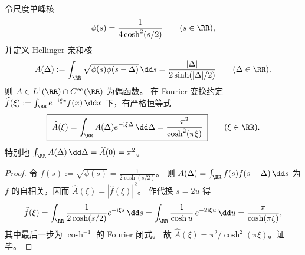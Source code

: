 %

\begin{proposition}\label{prop:xi-hellinger-kernel-fourier-sech2}
令尺度单峰核
\[
\phi(s)=\frac{1}{4\cosh^{2}(s/2)}\qquad(s\in\RR),
\]
并定义 Hellinger 亲和核
\[
A(\Delta):=\int_{\RR}\sqrt{\phi(s)\phi(s-\Delta)}\,\dd s
=\frac{|\Delta|}{2\sinh(|\Delta|/2)}\qquad(\Delta\in\RR).
\]
则 \(A\in L^{1}(\RR)\cap C^\infty(\RR)\) 为偶函数。
在 Fourier 变换约定
\(
\widehat f(\xi):=\int_{\RR}e^{-\mathrm{i}\xi x}f(x)\,\dd x
\)
下，有严格恒等式
\[
\boxed{\;
\widehat A(\xi)=\int_{\RR}A(\Delta)e^{-\mathrm{i}\xi\Delta}\,\dd\Delta
=\frac{\pi^{2}}{\cosh^{2}(\pi\xi)}\;}
\qquad(\xi\in\RR).
\]
特别地
\(
\int_{\RR}A(\Delta)\,\dd\Delta=\widehat A(0)=\pi^{2}
\)。
\end{proposition}
\begin{proof}
令
\(
f(s):=\sqrt{\phi(s)}=\frac{1}{2\cosh(s/2)}
\)。
则
\(
A(\Delta)=\int_{\RR}f(s)f(s-\Delta)\,\dd s
\)
为 \(f\) 的自相关，因而 \(\widehat A(\xi)=|\widehat f(\xi)|^{2}\)。
作代换 \(s=2u\) 得
\[
\widehat f(\xi)
=\int_{\RR}\frac{1}{2\cosh(s/2)}e^{-\mathrm{i}\xi s}\,\dd s
=\int_{\RR}\frac{1}{\cosh u}\,e^{-2\mathrm{i}\xi u}\,\dd u
=\frac{\pi}{\cosh(\pi\xi)},
\]
其中最后一步为 \(\cosh^{-1}\) 的 Fourier 闭式。
故 \(\widehat A(\xi)=\pi^{2}/\cosh^{2}(\pi\xi)\)。证毕。
\end{proof}



